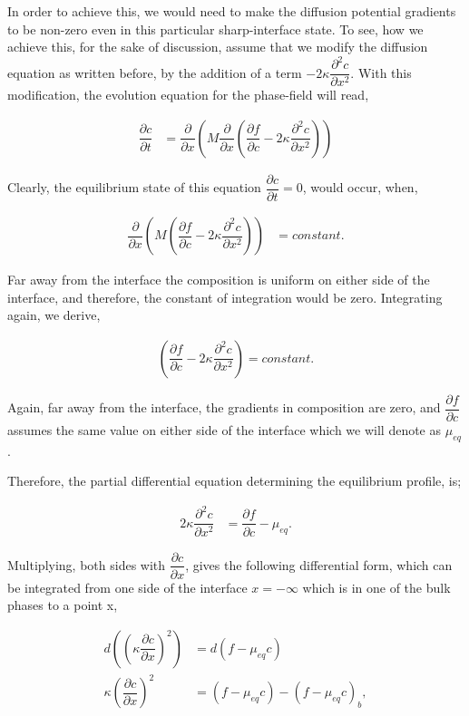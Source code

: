 \documentclass[english]{iambook}
\begin{document}
In order to achieve this, we would need to make the
diffusion potential gradients to be non-zero even in this
particular sharp-interface state.
To see, how we achieve this, for the sake of discussion, 
assume that we modify the diffusion equation as written 
before, by the addition of a term $-2\kappa\dfrac{\partial ^{2}c}{\partial x^{2}}$.
With this modification, the evolution equation for the phase-field 
will read, 

\begin{align}
\dfrac{\partial c}{\partial t} &= \dfrac{\partial}{\partial x}
\left(M\dfrac{\partial}{\partial x}\left(\dfrac{\partial f}{\partial c} 
- 2\kappa\dfrac{\partial ^{2}c}{\partial x^{2}}\right)\right) 
\end{align}

Clearly, the equilibrium state of this equation $\dfrac{\partial c}{\partial t}=0$,
would occur, when,

\begin{align}
 \dfrac{\partial}{\partial x}
 \left(M\left(\dfrac{\partial f}{\partial c} - 2\kappa\dfrac{\partial ^{2}c}{\partial x^{2}}\right)\right) &= constant.
\end{align}

Far away from the interface the composition is uniform on either side of the 
interface, and therefore, the constant of integration would be zero. Integrating
again, we derive, 

\begin{align}
 \left(\dfrac{\partial f}{\partial c} - 2\kappa\dfrac{\partial ^{2}c}{\partial x^{2}}\right) = constant.
\end{align}

Again, far away from the interface, the gradients in composition 
are zero, and $\dfrac{\partial f}{\partial c}$ assumes the same
value on either side of the interface which we will denote as 
$\mu_{eq}$.

Therefore, the partial differential equation determining the 
equilibrium profile, is;

\begin{align}
 2\kappa\dfrac{\partial ^{2}c}{\partial x^{2}} &= \dfrac{\partial f}{\partial c} - \mu_{eq}.
\end{align}

Multiplying, both sides with $\dfrac{\partial c}{\partial x}$, 
gives the following differential form, which can be integrated
from one side of the interface $x=-\infty$ which is in 
one of the bulk phases to a point x,  

\begin{align}
 d\left(\left(\kappa\dfrac{\partial c}{\partial x}\right)^{2}\right) &= d\left(f - \mu_{eq}c\right)\\
 \kappa\left(\dfrac{\partial c}{\partial x}\right)^{2} &= \left(f - \mu_{eq}c\right) - \left(f - \mu_{eq}c\right)_b,
 \label{Equipartition}
\end{align}
\end{document}

